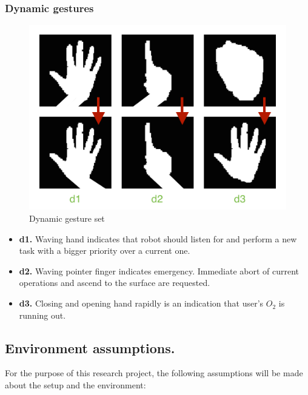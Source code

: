\documentclass[a4paper,11pt,oneside]{article}
\begin{document}
 \subsubsection{Dynamic gestures}

  \begin{figure}[H]
  \centering
  \includegraphics[scale=0.6]{dynamic-gestureset.png}
  \caption{Dynamic gesture set}
  \end{figure}
  
  \begin{itemize}
    \item \textbf{d1.} Waving hand indicates that robot should listen for and perform a new task with a bigger priority over a current one.
    \item \textbf{d2.} Waving pointer finger indicates emergency. Immediate abort of current operations and ascend to the surface are requested.
    \item \textbf{d3.} Closing and opening hand rapidly is an indication that user's $O_2$ is running out.
    \end{itemize}

\subsection{Environment assumptions.}

  For the purpose of this research project, the following assumptions will be made about the setup and the environment:\\
  
\end{document}

